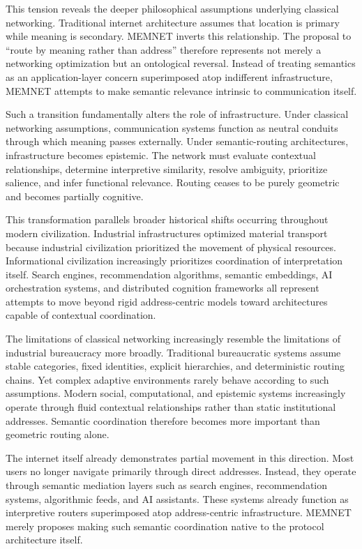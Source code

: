 \documentclass[11pt,a4paper]{article}
\begin{document}
This tension reveals the deeper philosophical assumptions underlying classical networking. Traditional internet architecture assumes that location is primary while meaning is secondary. MEMNET inverts this relationship. The proposal to ``route by meaning rather than address'' therefore represents not merely a networking optimization but an ontological reversal. Instead of treating semantics as an application-layer concern superimposed atop indifferent infrastructure, MEMNET attempts to make semantic relevance intrinsic to communication itself.

Such a transition fundamentally alters the role of infrastructure. Under classical networking assumptions, communication systems function as neutral conduits through which meaning passes externally. Under semantic-routing architectures, infrastructure becomes epistemic. The network must evaluate contextual relationships, determine interpretive similarity, resolve ambiguity, prioritize salience, and infer functional relevance. Routing ceases to be purely geometric and becomes partially cognitive.

This transformation parallels broader historical shifts occurring throughout modern civilization. Industrial infrastructures optimized material transport because industrial civilization prioritized the movement of physical resources. Informational civilization increasingly prioritizes coordination of interpretation itself. Search engines, recommendation algorithms, semantic embeddings, AI orchestration systems, and distributed cognition frameworks all represent attempts to move beyond rigid address-centric models toward architectures capable of contextual coordination.

The limitations of classical networking increasingly resemble the limitations of industrial bureaucracy more broadly. Traditional bureaucratic systems assume stable categories, fixed identities, explicit hierarchies, and deterministic routing chains. Yet complex adaptive environments rarely behave according to such assumptions. Modern social, computational, and epistemic systems increasingly operate through fluid contextual relationships rather than static institutional addresses. Semantic coordination therefore becomes more important than geometric routing alone.

The internet itself already demonstrates partial movement in this direction. Most users no longer navigate primarily through direct addresses. Instead, they operate through semantic mediation layers such as search engines, recommendation systems, algorithmic feeds, and AI assistants. These systems already function as interpretive routers superimposed atop address-centric infrastructure. MEMNET merely proposes making such semantic coordination native to the protocol architecture itself.
\end{document}
